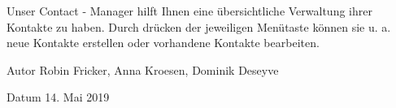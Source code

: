 Unser Contact -\/ Manager hilft Ihnen eine übersichtliche Verwaltung ihrer Kontakte zu haben. Durch drücken der jeweiligen Menütaste können sie u. a. neue Kontakte erstellen oder vorhandene Kontakte bearbeiten. \begin{DoxyAuthor}{Autor}
Robin Fricker, Anna Kroesen, Dominik Deseyve 
\end{DoxyAuthor}
\begin{DoxyDate}{Datum}
14. Mai 2019 
\end{DoxyDate}
